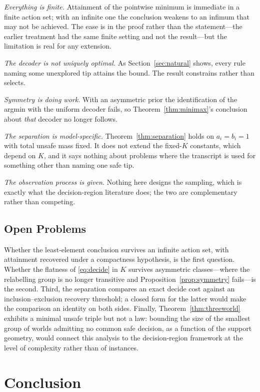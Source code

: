 \emph{Everything is finite.} Attainment of the pointwise minimum is immediate in a finite
action set; with an infinite one the conclusion weakens to an infimum that may not be achieved.
The ease is in the proof rather than the statement---the earlier treatment had the same finite
setting and not the result---but the limitation is real for any extension.

\emph{The decoder is not uniquely optimal.} As Section~\ref{sec:natural} shows, every rule
naming some unexplored tip attains the bound. The result constrains rather than selects.

\emph{Symmetry is doing work.} With an asymmetric prior the identification of the argmin with
the uniform decoder fails, so Theorem~\ref{thm:minimax}'s conclusion about \emph{that} decoder
no longer follows.

\emph{The separation is model-specific.} Theorem~\ref{thm:separation} holds on
$a_{i}=b_{i}=1$ with total unsafe mass fixed. It does not extend the fixed-$K$ constants,
which depend on $K$, and it says nothing about problems where the transcript is used for
something other than naming one safe tip.

\emph{The observation process is given.} Nothing here designs the sampling, which is exactly
what the decision-region literature does; the two are complementary rather than competing.

\subsection{Open Problems}

Whether the least-element conclusion survives an infinite action set, with attainment recovered
under a compactness hypothesis, is the first question. Whether the flatness of
\eqref{eq:decide} in $K$ survives asymmetric classes---where the relabelling group is no longer
transitive and Proposition~\ref{prop:symmetry} fails---is the second. Third, the separation
compares an exact decide cost against an inclusion--exclusion recovery threshold; a closed form
for the latter would make the comparison an identity on both sides. Finally, Theorem~\ref{thm:threeworld} exhibits a
minimal unsafe triple but not a law: bounding the size of the smallest group of worlds
admitting no common safe decision, as a function of the support geometry, would connect this
analysis to the decision-region framework at the level of complexity rather than of
instances.

\section{Conclusion}

